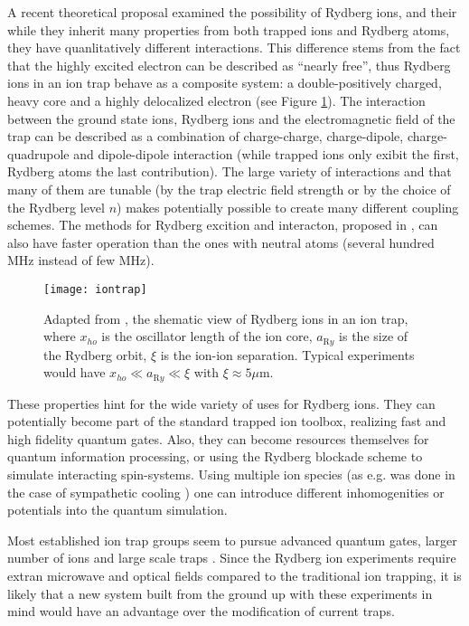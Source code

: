 A recent theoretical proposal \cite{Mueller2008} examined the possibility of Rydberg ions, and their while they inherit many properties from both trapped ions and Rydberg atoms, they have quanlitatively different interactions. This difference stems from the fact that the highly excited electron can be described as ``nearly free'', thus Rydberg ions in an ion trap behave as a composite system: a double-positively charged, heavy core and a highly delocalized electron (see Figure \ref{fig:iontrap}). The interaction between the ground state ions, Rydberg ions and the electromagnetic field of the trap can be described as a combination of charge-charge, charge-dipole, charge-quadrupole and dipole-dipole interaction (while trapped ions only exibit the first, Rydberg atoms the last contribution). The large variety of interactions and that many of them are tunable (by the trap electric field strength or by the choice of the Rydberg level $n$) makes potentially possible to create many different coupling schemes. The methods for Rydberg excition and interacton, proposed in \cite{Mueller2008}, can also have faster operation than the ones with neutral atoms (several hundred MHz instead of few MHz).

\begin{figure}
  \begin{center}
    \texttt{[image: iontrap]}
    \caption{Adapted from \cite{Mueller2008}, the shematic view of Rydberg ions in an ion trap, where $x_{ho}$ is the oscillator length of the ion core, $a_{\mathrm Ry}$ is the size of the Rydberg orbit, $\xi$ is the ion-ion separation. Typical experiments would have $x_{ho} \ll a_{\mathrm Ry} \ll \xi$ with $\xi \approx 5 \mu{\mathrm m}$.}
  \end{center}
  \label{fig:iontrap}
\end{figure}

These properties hint for the wide variety of uses for Rydberg ions. They can potentially become part of the standard trapped ion toolbox, realizing fast and high fidelity quantum gates. Also, they can become resources themselves for quantum information processing, or using the Rydberg blockade scheme to simulate interacting spin-systems. Using multiple ion species (as e.g. was done in the case of sympathetic cooling \cite{Home2009}) one can introduce different inhomogenities or potentials into the quantum simulation.

Most established ion trap groups seem to pursue advanced quantum gates, larger number of ions and large scale traps \cite{Kielpinski2002}. Since the Rydberg ion experiments require extran microwave and optical fields compared to the traditional ion trapping, it is likely that a new system built from the ground up with these experiments in mind would have an advantage over the modification of current traps.


